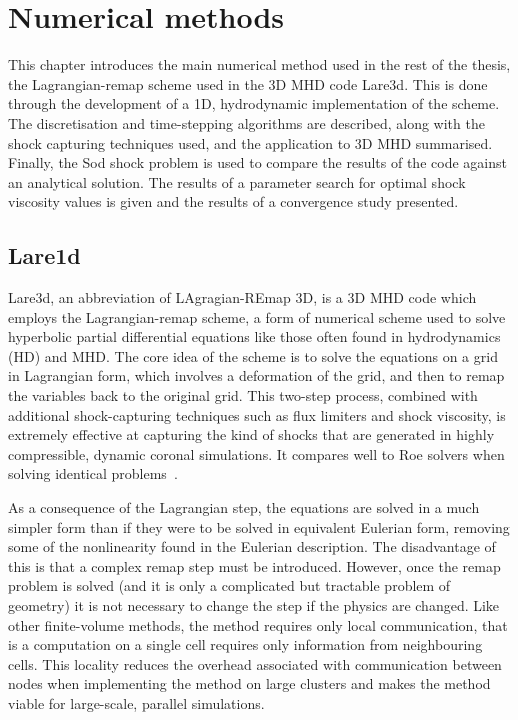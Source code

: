 \chapter{Numerical methods}

\label{chp:numerical_methods}

\graphicspath{{images/numerical_methods/}}

This chapter introduces the main numerical method used in the rest of the thesis, the Lagrangian-remap scheme used in the 3D MHD code Lare3d. This is done through the development of a 1D, hydrodynamic implementation of the scheme. The discretisation and time-stepping algorithms are described, along with the shock capturing techniques used, and the application to 3D MHD summarised. Finally, the Sod shock problem is used to compare the results of the code against an analytical solution. The results of a parameter search for optimal shock viscosity values is given and the results of a convergence study presented.

\section{Lare1d}

Lare3d, an abbreviation of LAgragian-REmap 3D, is a 3D MHD code which employs the Lagrangian-remap scheme, a form of numerical scheme used to solve hyperbolic partial differential equations like those often found in hydrodynamics (HD) and MHD. The core idea of the scheme is to solve the equations on a grid in Lagrangian form, which involves a deformation of the grid, and then to remap the variables back to the original grid. This two-step process, combined with additional shock-capturing techniques such as flux limiters and shock viscosity, is extremely effective at capturing the kind of shocks that are generated in highly compressible, dynamic coronal simulations. It compares well to Roe solvers when solving identical problems~\cite{arberStaggeredGridLagrangian2001}.

As a consequence of the Lagrangian step, the equations are solved in a much simpler form than if they were to be solved in equivalent Eulerian form, removing some of the nonlinearity found in the Eulerian description. The disadvantage of this is that a complex remap step must be introduced. However, once the remap problem is solved (and it is only a complicated but tractable problem of geometry) it is not necessary to change the step if the physics are changed. Like other finite-volume methods, the method requires only local communication, that is a computation on a single cell requires only information from neighbouring cells. This locality reduces the overhead associated with communication between nodes when implementing the method on large clusters and makes the method viable for large-scale, parallel simulations. 

